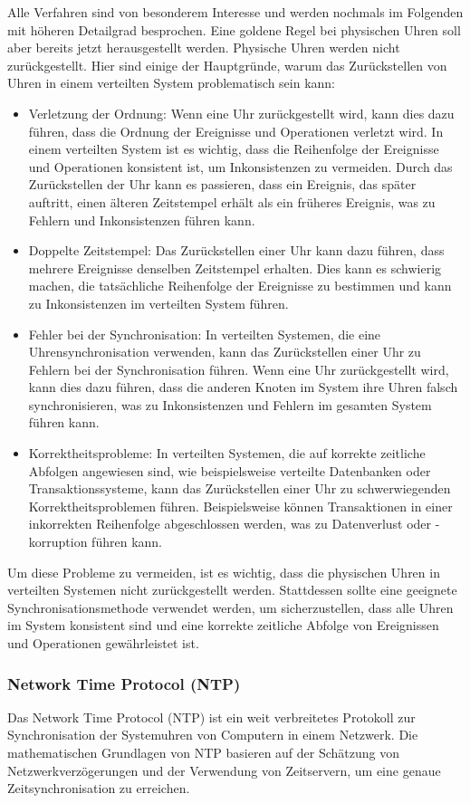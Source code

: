 Alle Verfahren sind von besonderem Interesse und werden nochmals im Folgenden mit höheren Detailgrad besprochen. Eine goldene Regel bei physischen Uhren soll aber bereits jetzt herausgestellt werden. Physische Uhren werden nicht zurückgestellt. Hier sind einige der Hauptgründe, warum das Zurückstellen von Uhren in einem verteilten System problematisch sein kann:
\begin{itemize}
\item Verletzung der Ordnung: Wenn eine Uhr zurückgestellt wird, kann dies dazu führen, dass die Ordnung der Ereignisse und Operationen verletzt wird. In einem verteilten System ist es wichtig, dass die Reihenfolge der Ereignisse und Operationen konsistent ist, um Inkonsistenzen zu vermeiden. Durch das Zurückstellen der Uhr kann es passieren, dass ein Ereignis, das später auftritt, einen älteren Zeitstempel erhält als ein früheres Ereignis, was zu Fehlern und Inkonsistenzen führen kann.
\item Doppelte Zeitstempel: Das Zurückstellen einer Uhr kann dazu führen, dass mehrere Ereignisse denselben Zeitstempel erhalten. Dies kann es schwierig machen, die tatsächliche Reihenfolge der Ereignisse zu bestimmen und kann zu Inkonsistenzen im verteilten System führen.
\item Fehler bei der Synchronisation: In verteilten Systemen, die eine Uhrensynchronisation verwenden, kann das Zurückstellen einer Uhr zu Fehlern bei der Synchronisation führen. Wenn eine Uhr zurückgestellt wird, kann dies dazu führen, dass die anderen Knoten im System ihre Uhren falsch synchronisieren, was zu Inkonsistenzen und Fehlern im gesamten System führen kann.
\item Korrektheitsprobleme: In verteilten Systemen, die auf korrekte zeitliche Abfolgen angewiesen sind, wie beispielsweise verteilte Datenbanken oder Transaktionssysteme, kann das Zurückstellen einer Uhr zu schwerwiegenden Korrektheitsproblemen führen. Beispielsweise können Transaktionen in einer inkorrekten Reihenfolge abgeschlossen werden, was zu Datenverlust oder -korruption führen kann.
\end{itemize}
Um diese Probleme zu vermeiden, ist es wichtig, dass die physischen Uhren in verteilten Systemen nicht zurückgestellt werden. Stattdessen sollte eine geeignete Synchronisationsmethode verwendet werden, um sicherzustellen, dass alle Uhren im System konsistent sind und eine korrekte zeitliche Abfolge von Ereignissen und Operationen gewährleistet ist.

\subsubsection{Network Time Protocol (NTP)}
Das Network Time Protocol (NTP) ist ein weit verbreitetes Protokoll zur Synchronisation der Systemuhren von Computern in einem Netzwerk. Die mathematischen Grundlagen von NTP basieren auf der Schätzung von Netzwerkverzögerungen und der Verwendung von Zeitservern, um eine genaue Zeitsynchronisation zu erreichen.

